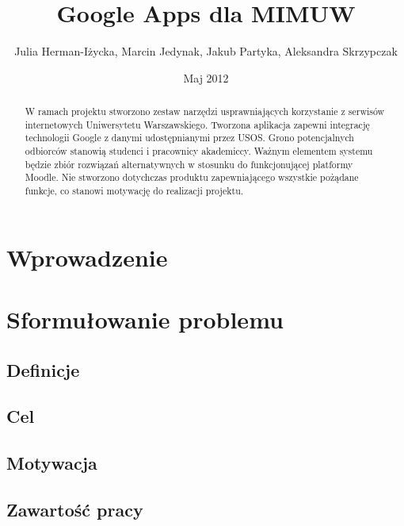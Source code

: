 \documentclass{pracamgr}
\author{Julia Herman-Iżycka, Marcin Jedynak, Jakub Partyka, Aleksandra Skrzypczak}
\title{Google Apps dla MIMUW}
\date{Maj 2012}
\begin{document}
\maketitle

\begin{abstract}
W ramach projektu stworzono zestaw narzędzi usprawniających korzystanie 
z serwisów internetowych Uniwersytetu Warszawskiego. Tworzona aplikacja zapewni integrację 
technologii Google z danymi udostępnianymi przez USOS. Grono potencjalnych odbiorców stanowią 
studenci i pracownicy akademiccy. Ważnym elementem systemu będzie zbiór rozwiązań 
alternatywnych w stosunku do funkcjonującej platformy Moodle. Nie stworzono dotychczas 
produktu zapewniającego wszystkie pożądane funkcje, co stanowi motywację do realizacji projektu. 
\end{abstract}

\tableofcontents

\chapter*{Wprowadzenie}


\chapter{Sformułowanie problemu}
\section{Definicje}

\section{Cel}
\section{Motywacja}
\section{Zawartość pracy}
\end{document}
